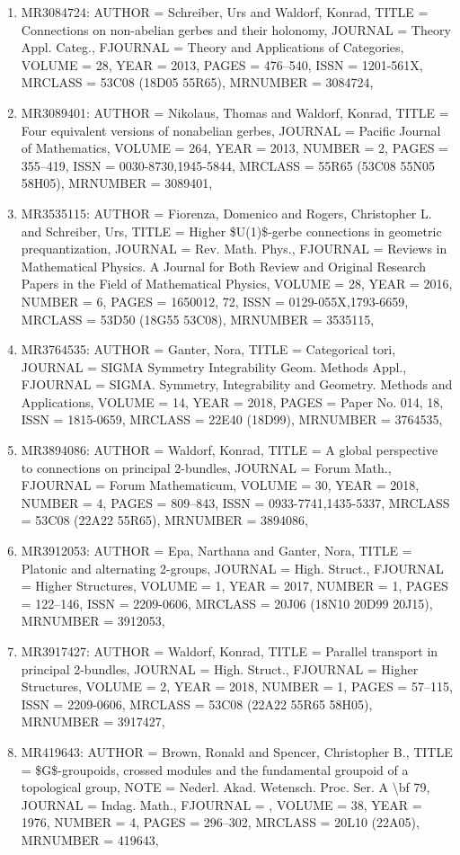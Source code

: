 \documentclass[11pt]{article}
\begin{document}
\begin{enumerate}[leftmargin=*]
  \item MR3084724: AUTHOR = Schreiber, Urs and Waldorf, Konrad, TITLE = Connections on non-abelian gerbes and their holonomy, JOURNAL = Theory Appl. Categ., FJOURNAL = Theory and Applications of Categories, VOLUME = 28, YEAR = 2013, PAGES = 476--540, ISSN = 1201-561X, MRCLASS = 53C08 (18D05 55R65), MRNUMBER = 3084724,
  \item MR3089401: AUTHOR = Nikolaus, Thomas and Waldorf, Konrad, TITLE = Four equivalent versions of nonabelian gerbes, JOURNAL = Pacific Journal of Mathematics, VOLUME = 264, YEAR = 2013, NUMBER = 2, PAGES = 355--419, ISSN = 0030-8730,1945-5844, MRCLASS = 55R65 (53C08 55N05 58H05), MRNUMBER = 3089401,
  \item MR3535115: AUTHOR = Fiorenza, Domenico and Rogers, Christopher L. and Schreiber, Urs, TITLE = Higher \$U(1)\$-gerbe connections in geometric prequantization, JOURNAL = Rev. Math. Phys., FJOURNAL = Reviews in Mathematical Physics. A Journal for Both Review and Original Research Papers in the Field of Mathematical Physics, VOLUME = 28, YEAR = 2016, NUMBER = 6, PAGES = 1650012, 72, ISSN = 0129-055X,1793-6659, MRCLASS = 53D50 (18G55 53C08), MRNUMBER = 3535115,
  \item MR3764535: AUTHOR = Ganter, Nora, TITLE = Categorical tori, JOURNAL = SIGMA Symmetry Integrability Geom. Methods Appl., FJOURNAL = SIGMA. Symmetry, Integrability and Geometry. Methods and Applications, VOLUME = 14, YEAR = 2018, PAGES = Paper No. 014, 18, ISSN = 1815-0659, MRCLASS = 22E40 (18D99), MRNUMBER = 3764535,
  \item MR3894086: AUTHOR = Waldorf, Konrad, TITLE = A global perspective to connections on principal 2-bundles, JOURNAL = Forum Math., FJOURNAL = Forum Mathematicum, VOLUME = 30, YEAR = 2018, NUMBER = 4, PAGES = 809--843, ISSN = 0933-7741,1435-5337, MRCLASS = 53C08 (22A22 55R65), MRNUMBER = 3894086,
  \item MR3912053: AUTHOR = Epa, Narthana and Ganter, Nora, TITLE = Platonic and alternating 2-groups, JOURNAL = High. Struct., FJOURNAL = Higher Structures, VOLUME = 1, YEAR = 2017, NUMBER = 1, PAGES = 122--146, ISSN = 2209-0606, MRCLASS = 20J06 (18N10 20D99 20J15), MRNUMBER = 3912053,
  \item MR3917427: AUTHOR = Waldorf, Konrad, TITLE = Parallel transport in principal 2-bundles, JOURNAL = High. Struct., FJOURNAL = Higher Structures, VOLUME = 2, YEAR = 2018, NUMBER = 1, PAGES = 57--115, ISSN = 2209-0606, MRCLASS = 53C08 (22A22 55R65 58H05), MRNUMBER = 3917427,
  \item MR419643: AUTHOR = Brown, Ronald and Spencer, Christopher B., TITLE = \$G\$-groupoids, crossed modules and the fundamental groupoid of a topological group, NOTE = Nederl. Akad. Wetensch. Proc. Ser. A \textbackslash{}bf 79, JOURNAL = Indag. Math., FJOURNAL = , VOLUME = 38, YEAR = 1976, NUMBER = 4, PAGES = 296--302, MRCLASS = 20L10 (22A05), MRNUMBER = 419643,

\end{enumerate}
\end{document}
